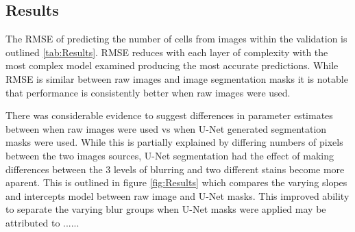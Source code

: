 \documentclass[isoft]{poster_class_UofC}
\begin{document}
\begin{poster}
        \section{Results}%
The RMSE of predicting the number of cells from images within the validation is outlined \ref{tab:Results}.  RMSE reduces with each layer of complexity with the most complex model examined producing the most accurate predictions.  While RMSE is similar between raw images and image segmentation masks it is notable that performance is consistently better when raw images were used.  

There was considerable evidence to suggest differences in parameter estimates between when raw images were used vs when U-Net generated segmentation masks were used.  While this is partially explained by differing numbers of pixels between the two images sources, U-Net segmentation had the effect of making differences between the 3 levels of blurring and two different stains become more aparent.  This is outlined in figure \ref{fig:Results} which compares the varying slopes and intercepts model between raw image and U-Net masks. This improved ability to separate the varying blur groups when U-Net masks were applied may be attributed to ......
        
                \vspace{1cm}
            \begin{table}
                \centering
                \captionsetup{type=table}
                \caption{\textit{Corpus} utilizados no estudo}
                \label{Corpus}
                \renewcommand{\arraystretch}{1.2}
            \end{table}
            \vspace{1cm}
            

\end{poster}
\end{document}
